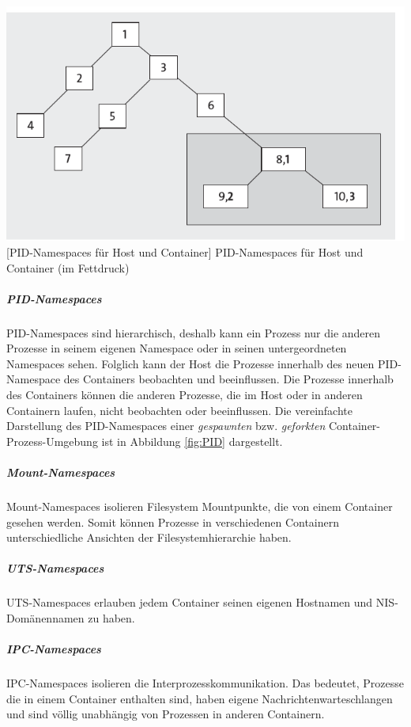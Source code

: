 \vspace{1em}
\begin{minipage}{\linewidth}
	\centering
	\includegraphics[width=1\linewidth]{pics/PID.PNG}
	[PID-Namespaces für Host und Container]{ PID-Namespaces für Host und Container (im Fettdruck) \cite{Liebel2017SkalierbareContainer-Infrastrukturen}}
	\label{fig:PID}
\end{minipage}

\subparagraph{PID-Namespaces} PID-Namespaces sind hierarchisch, deshalb kann ein Prozess nur die anderen Prozesse in seinem eigenen Namespace oder in seinen untergeordneten Namespaces sehen. Folglich kann der Host die Prozesse innerhalb des neuen PID-Namespace des Containers beobachten und beeinflussen. Die Prozesse innerhalb des Containers können die anderen Prozesse, die im Host oder in anderen Containern laufen, nicht beobachten oder beeinflussen. Die vereinfachte Darstellung des PID-Namespaces einer \emph{gespawnten} bzw. \emph{geforkten} Container-Prozess-Umgebung ist in Abbildung \ref{fig:PID} dargestellt. \cite{Liebel2017SkalierbareContainer-Infrastrukturen}

\subparagraph{Mount-Namespaces} Mount-Namespaces isolieren Filesystem Mountpunkte, die von einem Container gesehen werden. Somit können Prozesse in verschiedenen Containern unterschiedliche Ansichten der Filesystemhierarchie haben.

\subparagraph{UTS-Namespaces} UTS-Namespaces erlauben jedem Container seinen eigenen Hostnamen und \ac{NIS}-Domänennamen zu haben.

\subparagraph{IPC-Namespaces} IPC-Namespaces isolieren die Interprozesskommunikation. Das bedeutet, Prozesse die in einem Container enthalten sind, haben eigene Nachrichtenwarteschlangen und sind völlig unabhängig von Prozessen in anderen Containern.

